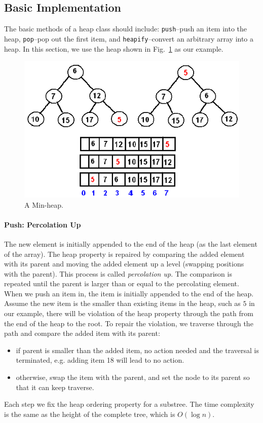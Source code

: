 \documentclass[../main.tex]{subfiles}
\begin{document}
\subsection{Basic Implementation}
The basic methods of a heap class should include: \texttt{push}--push an item into the heap, \texttt{pop}--pop out the first item, and \texttt{heapify}--convert an arbitrary array into a heap. In this section, we use the heap shown in Fig.~\ref{fig:min-heap} as our example. 
\begin{figure}[h!]
    \centering
    \includegraphics[width = 0.8\columnwidth]{fig/min_heap_push.png}
    \caption{A Min-heap.}
    \label{fig:min-heap}
\end{figure}
\paragraph{Push:  Percolation Up} The new element is initially appended to the end of the heap (as the last element of the array). The heap property is repaired by comparing the added element with its parent and moving the added element up a level (swapping positions with the parent). This process is called \textit{percolation up}. The comparison is repeated until the parent is larger than or equal to the percolating element.  When we push an item in,  the item is initially appended to the end of the heap. Assume the new item  is the smaller than existing items in the heap, such as $5$ in our example, there will be violation of the heap property through the path from the end of the heap to the root.  To repair the violation,  we traverse through the path and compare the added item with its parent: 
\begin{itemize}
    \item if parent is smaller than the added item, no action needed and the traversal is terminated, e.g. adding item 18 will lead to no action. 
    \item otherwise, swap the item with the parent, and set the node to its parent so that it can keep traverse. 
\end{itemize}
Each step we fix the heap ordering property for a substree. 
 The time complexity is the same as the height of the complete tree, which is $O(\log n)$. 
 
\end{document}
